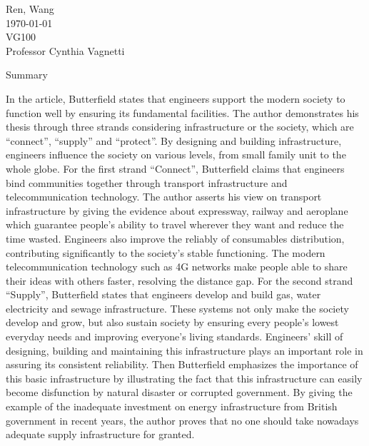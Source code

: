 \documentclass[12pt,a4]{article}
\begin{document}
\begin{flushleft}
Ren, Wang\\
\today\\
VG100\\
Professor Cynthia Vagnetti \\
\end{flushleft}

\begin{center}
Summary
\end{center}


In the article, Butterfield \cite{but} states that engineers support the modern
society to function well by ensuring its fundamental facilities. 
The author demonstrates his thesis through three strands considering
infrastructure or the society, which are ``connect'', ``supply'' and
``protect''. 
By designing and building infrastructure, engineers influence the society on
various levels, from small family unit to the whole globe.  
%
%
For the first strand ``Connect'', Butterfield claims that engineers bind
communities together through transport infrastructure and telecommunication
technology.
The author asserts his view on transport infrastructure by giving the evidence
about expressway, railway and aeroplane which guarantee people's ability to
travel wherever they want and reduce the time wasted. 
Engineers also improve the reliably of consumables distribution, contributing
significantly to the society's stable functioning. 
The modern telecommunication technology such as 4G networks make people able to
share their ideas with others faster, resolving the distance gap. 
%
%
For the second strand ``Supply'', Butterfield states that engineers develop and
build gas, water electricity and sewage infrastructure.
These systems not only make the society develop and grow, but also sustain
society by ensuring every people's lowest everyday needs and improving
everyone's living standards. 
Engineers' skill of designing, building and maintaining this infrastructure
plays an important role in assuring its consistent reliability.
Then Butterfield emphasizes the importance of this basic infrastructure by
illustrating the fact that this infrastructure can easily become disfunction by
natural disaster or corrupted government.
By giving the example of the inadequate investment on energy infrastructure from
British government in recent years, the author proves that no one should take
nowadays adequate supply infrastructure for granted.
%

%


\end{document}
